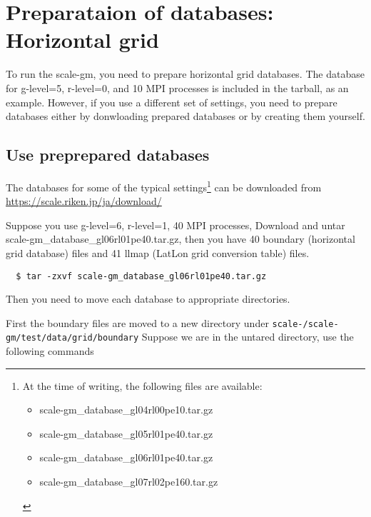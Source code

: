 \section{Preparataion of databases: Horizontal grid}

To run the scale-gm, you need to prepare horizontal grid databases. 
The database for g-level=5, r-level=0, and 10 MPI processes 
is included in the tarball, as an example.
However, if you use a different set of settings, you need to prepare databases 
either by donwloading prepared databases or by creating them yourself.


\subsection{Use preprepared databases}
The databases for some of the typical settings\footnote{At the time of
  writing, the following files are available:
  \begin{itemize}
    \item scale-gm\_database\_gl04rl00pe10.tar.gz
    \item scale-gm\_database\_gl05rl01pe40.tar.gz
    \item scale-gm\_database\_gl06rl01pe40.tar.gz
    \item scale-gm\_database\_gl07rl02pe160.tar.gz
\end{itemize}} can be downloaded from \noindent \url{https://scale.riken.jp/ja/download/}

Suppose you use g-level=6, r-level=1, 40 MPI processes, 
Download and untar scale-gm\_database\_gl06rl01pe40.tar.gz, 
 then you have 40 boundary (horizontal grid database)
files and 41 llmap (LatLon
grid conversion table) files. 
\begin{verbatim}
  $ tar -zxvf scale-gm_database_gl06rl01pe40.tar.gz
\end{verbatim}

\noindent Then you need to move each database to appropriate directories.

\noindent First the boundary files are moved to a new directory under 
\texttt{scale-{\version}/scale-gm/test/data/grid/boundary}
Suppose we are in the untared directory, use the following commands
\\

